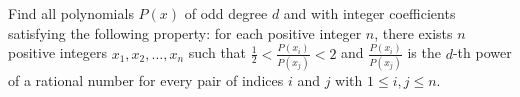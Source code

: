 Find all polynomials 
$P(x)$
 of odd degree 
$d$
 and with integer coefficients satisfying the following property: for each positive integer 
$n$, 
 there exists 
$n$
 positive integers 
$x_1, x_2, \ldots, x_n$
 such that 
$\frac12 < \frac{P(x_i)}{P(x_j)} < 2$
 and 
$\frac{P(x_i)}{P(x_j)}$
 is the 
$d$-th power of a rational number for every pair of indices 
$i$
 and 
$j$
 with 
$1 \leq i, j \leq n$. 